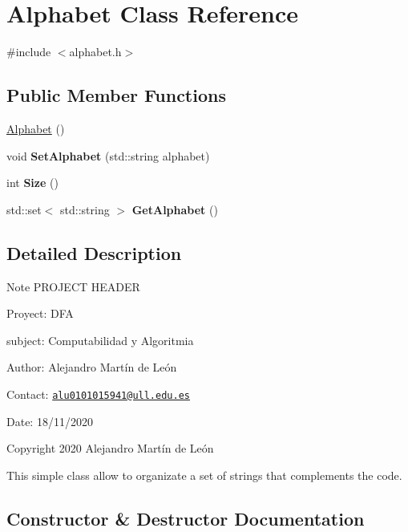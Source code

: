 \hypertarget{classAlphabet}{}\section{Alphabet Class Reference}
\label{classAlphabet}


{\ttfamily \#include $<$alphabet.\+h$>$}

\subsection*{Public Member Functions}
\begin{DoxyCompactItemize}
\item 
\hyperlink{classAlphabet_aac9f2f615174ca6c8f89331239cb765e}{Alphabet} ()
\item 
\mbox{\label{classAlphabet_a2a61d36e511d77704215dce942847ed9}} 
void {\bfseries Set\+Alphabet} (std\+::string alphabet)
\item 
\mbox{\label{classAlphabet_a154f45f063a75a8116e8f9022440287e}} 
int {\bfseries Size} ()
\item 
\mbox{\label{classAlphabet_aa27c86b98daa058dc4f299b13c76ee8b}} 
std\+::set$<$ std\+::string $>$ {\bfseries Get\+Alphabet} ()
\end{DoxyCompactItemize}


\subsection{Detailed Description}
\begin{DoxyNote}{Note}
P\+R\+O\+J\+E\+CT H\+E\+A\+D\+ER 

Proyect\+: D\+FA 

subject\+: Computabilidad y Algoritmia 

Author\+: Alejandro Martín de León 

Contact\+: \href{mailto:alu0101015941@ull.edu.es}{\tt alu0101015941@ull.\+edu.\+es} 

Date\+: 18/11/2020 

Copyright 2020 Alejandro Martín de León
\end{DoxyNote}
This simple class allow to organizate a set of strings that complements the code. 

\subsection{Constructor \& Destructor Documentation}
\mbox{\label{classAlphabet_aac9f2f615174ca6c8f89331239cb765e}} 
